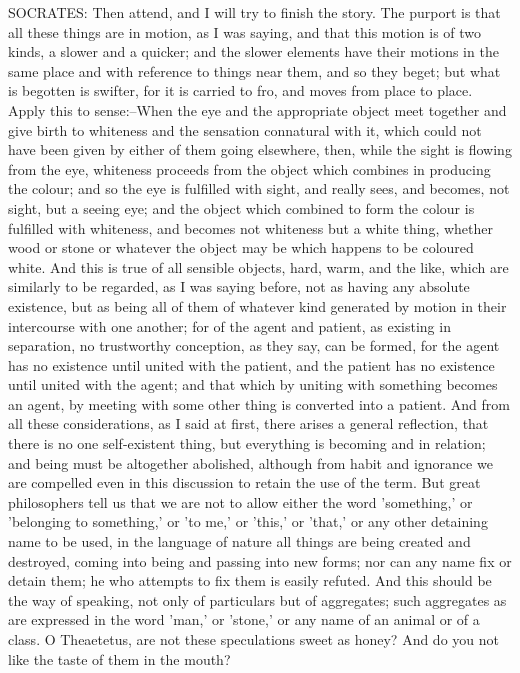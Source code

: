 SOCRATES: Then attend, and I will try to finish the story. The purport
is that all these things are in motion, as I was saying, and that this
motion is of two kinds, a slower and a quicker; and the slower elements
have their motions in the same place and with reference to things near
them, and so they beget; but what is begotten is swifter, for it
is carried to fro, and moves from place to place. Apply this to
sense:--When the eye and the appropriate object meet together and give
birth to whiteness and the sensation connatural with it, which could not
have been given by either of them going elsewhere, then, while the
sight is flowing from the eye, whiteness proceeds from the object which
combines in producing the colour; and so the eye is fulfilled with
sight, and really sees, and becomes, not sight, but a seeing eye;
and the object which combined to form the colour is fulfilled with
whiteness, and becomes not whiteness but a white thing, whether wood or
stone or whatever the object may be which happens to be coloured white.
And this is true of all sensible objects, hard, warm, and the like,
which are similarly to be regarded, as I was saying before, not as
having any absolute existence, but as being all of them of whatever kind
generated by motion in their intercourse with one another; for of the
agent and patient, as existing in separation, no trustworthy conception,
as they say, can be formed, for the agent has no existence until united
with the patient, and the patient has no existence until united with
the agent; and that which by uniting with something becomes an agent, by
meeting with some other thing is converted into a patient. And from
all these considerations, as I said at first, there arises a general
reflection, that there is no one self-existent thing, but everything
is becoming and in relation; and being must be altogether abolished,
although from habit and ignorance we are compelled even in this
discussion to retain the use of the term. But great philosophers tell us
that we are not to allow either the word 'something,' or 'belonging to
something,' or 'to me,' or 'this,' or 'that,' or any other detaining
name to be used, in the language of nature all things are being created
and destroyed, coming into being and passing into new forms; nor can any
name fix or detain them; he who attempts to fix them is easily refuted.
And this should be the way of speaking, not only of particulars but
of aggregates; such aggregates as are expressed in the word 'man,' or
'stone,' or any name of an animal or of a class. O Theaetetus, are not
these speculations sweet as honey? And do you not like the taste of them
in the mouth?

